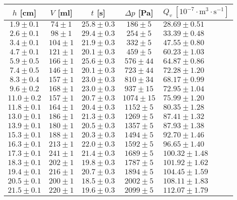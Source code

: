 \documentclass[a4paper]{article}
\begin{document}
\begin{center}
    \label{tab:title}
    \begin{tabular}{ | c | c | c | c |  p{3cm} |} \hline
    $h$ [cm] & $V$ [ml] & $t$ [s]& $\Delta p$ [Pa] & $Q_{v} \: [10^{-7} \cdot \mathrm{m^{3} \cdot s^{-1}}]$   \\ \hline
    $1.9\pm0.1$ & $74\pm1$ & $25.8\pm0.3$ & $186\pm5$ & $28.69\pm0.51$ \\ \hline
    $2.6\pm0.1$ & $98\pm1$ & $29.4\pm0.3$ & $254\pm5$ & $33.39\pm0.48$ \\ \hline
    $3.4\pm0.1$ & $104\pm1$ & $21.9\pm0.3$ & $332\pm5$ & $47.55\pm0.80$ \\ \hline
    $4.7\pm0.1$ & $121\pm1$ & $20.1\pm0.3$ & $459\pm5$ & $60.23\pm1.03$ \\ \hline
    $5.9\pm0.5$ & $166\pm1$ & $25.6\pm0.3$ & $576\pm44$ & $64.87\pm0.86$ \\ \hline
    $7.4\pm0.5$ & $146\pm1$ & $20.1\pm0.3$ & $723\pm44$ & $72.28\pm1.20$ \\ \hline
    $8.3\pm0.4$ & $157\pm1$ & $23.0\pm0.3$ & $810\pm34$ & $68.17\pm0.99$ \\ \hline
    $9.6\pm0.2$ & $168\pm1$ & $23.0\pm0.3$ & $937\pm15$ & $72.95\pm1.04$ \\ \hline
    $11.0\pm0.2$ & $157\pm1$ & $20.7\pm0.3$ & $1074\pm15$ & $75.99\pm1.20$ \\ \hline
    $11.8\pm0.1$ & $164\pm1$ & $20.4\pm0.3$ & $1152\pm5$ & $80.35\pm1.28$ \\ \hline
    $13.0\pm0.1$ & $186\pm1$ & $21.3\pm0.3$ & $1269\pm5$ & $87.41\pm1.32$ \\ \hline
    $13.9\pm0.1$ & $180\pm1$ & $20.5\pm0.3$ & $1357\pm5$ & $87.93\pm1.38$ \\ \hline
    $15.3\pm0.1$ & $188\pm1$ & $20.3\pm0.3$ & $1494\pm5$ & $92.70\pm1.46$ \\ \hline
    $16.3\pm0.1$ & $213\pm1$ & $22.0\pm0.3$ & $1592\pm5$ & $96.65\pm1.40$ \\ \hline
    $17.3\pm0.1$ & $241\pm1$ & $21.4\pm0.3$ & $1689\pm5$ & $100.32\pm1.48$ \\ \hline
    $18.3\pm0.1$ & $202\pm1$ & $19.8\pm0.3$ & $1787\pm5$ & $101.92\pm1.62$ \\ \hline
    $19.4\pm0.1$ & $216\pm1$ & $20.7\pm0.3$ & $1894\pm5$ & $104.45\pm1.59$ \\ \hline
    $20.5\pm0.1$ & $200\pm1$ & $18.5\pm0.3$ & $2002\pm5$ & $108.11\pm1.83$ \\ \hline
    $21.5\pm0.1$ & $220\pm1$ & $19.6\pm0.3$ & $2099\pm5$ & $112.07\pm1.79$ \\ \hline
    \end{tabular}
\end{center}
\end{document}
